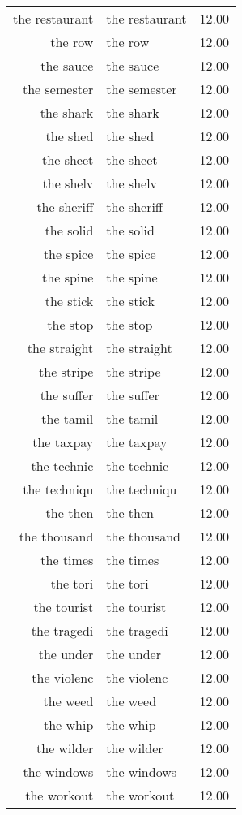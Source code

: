 \begin{table}[ht]
\begin{tabular}{rlr}
  the restaurant & the restaurant & 12.00 \\ 
  the row & the row & 12.00 \\ 
  the sauce & the sauce & 12.00 \\ 
  the semester & the semester & 12.00 \\ 
  the shark & the shark & 12.00 \\ 
  the shed & the shed & 12.00 \\ 
  the sheet & the sheet & 12.00 \\ 
  the shelv & the shelv & 12.00 \\ 
  the sheriff & the sheriff & 12.00 \\ 
  the solid & the solid & 12.00 \\ 
  the spice & the spice & 12.00 \\ 
  the spine & the spine & 12.00 \\ 
  the stick & the stick & 12.00 \\ 
  the stop & the stop & 12.00 \\ 
  the straight & the straight & 12.00 \\ 
  the stripe & the stripe & 12.00 \\ 
  the suffer & the suffer & 12.00 \\ 
  the tamil & the tamil & 12.00 \\ 
  the taxpay & the taxpay & 12.00 \\ 
  the technic & the technic & 12.00 \\ 
  the techniqu & the techniqu & 12.00 \\ 
  the then & the then & 12.00 \\ 
  the thousand & the thousand & 12.00 \\ 
  the times & the times & 12.00 \\ 
  the tori & the tori & 12.00 \\ 
  the tourist & the tourist & 12.00 \\ 
  the tragedi & the tragedi & 12.00 \\ 
  the under & the under & 12.00 \\ 
  the violenc & the violenc & 12.00 \\ 
  the weed & the weed & 12.00 \\ 
  the whip & the whip & 12.00 \\ 
  the wilder & the wilder & 12.00 \\ 
  the windows & the windows & 12.00 \\ 
  the workout & the workout & 12.00 \\ 

\end{tabular}
\end{table}
